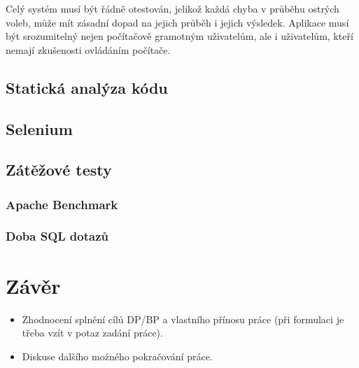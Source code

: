 \documentclass[11pt,twoside,a4paper]{book}
\begin{document}
Celý systém musí být řádně otestován, jelikož každá chyba v průběhu ostrých voleb, může mít zásadní dopad na jejich průběh i jejich výsledek. Aplikace musí být srozumitelný nejen počítačově gramotným uživatelům, ale i uživatelům, kteří nemají zkušenosti  ovládáním počítače. 

\section{Statická analýza kódu}

\section{Selenium}

\section{Zátěžové testy}

\subsection{Apache Benchmark}

\subsection{Doba SQL dotazů}




\chapter{Závěr}

\begin{itemize}
\item Zhodnocení splnění cílů DP/BP a  vlastního přínosu práce (při formulaci je třeba vzít v potaz zadání práce).
\item Diskuse dalšího možného pokračování práce.
\end{itemize} 


\end{document}
